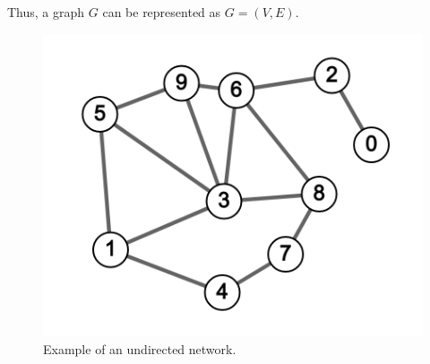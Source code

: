 Thus, a graph $G$ can be represented as $G=(V,E)$.

\begin{figure}[H]
  \centering
    \includegraphics[scale=.25]{img/undirected_sample.png}
    \caption{Example of an undirected network.}
    \label{fig:net_un}
\end{figure}

